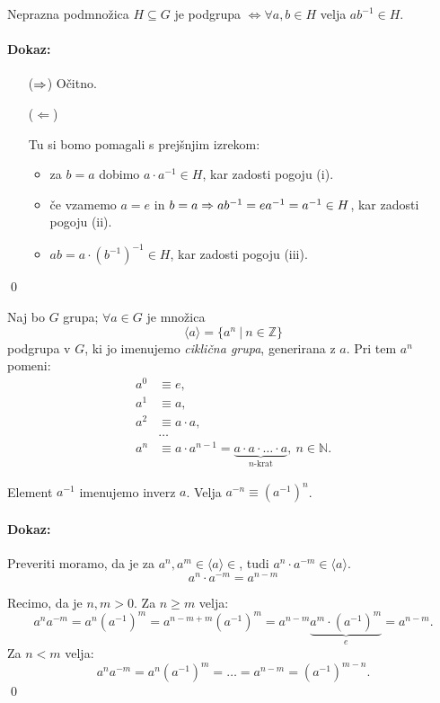 \begin{trditev}
	Neprazna podmno\v zica $H \subseteq G$ je podgrupa $\iff \forall a,b \in H$ velja $ab^{-1} \in H$.
\end{trditev}

\paragraph{Dokaz:}
\begin{itemize}
	\item[($\Rightarrow$)]{ O\v citno.}
	\item[($\Leftarrow$)]{Tu si bomo pomagali s prej\v snjim izrekom:
		\begin{itemize}
			\item{za $b = a$ dobimo $a\cdot a^{-1} \in H$, kar zadosti pogoju (i).}
			\item{\v ce vzamemo $a = e$ in $b = a \Rightarrow ab^{-1} = ea^{-1} = a^{-1} \in H$, kar zadosti pogoju (ii).}
			\item{$ab = a \cdot (b^{-1})^{-1} \in H$, kar zadosti pogoju (iii).}
		\end{itemize}}
\end{itemize}
\qed

\begin{posledica} Naj bo $G$ grupa; $\forall a \in G$ je mno\v zica
\[
	\langle a \rangle = \{a^n\ |\ n\in\mathbb{Z}\}
\]
podgrupa v $G$, ki jo imenujemo \emph{cikli\v cna grupa}, generirana z $a$. Pri tem $a^n$ pomeni:
\begin{align*}
	a^0 &\equiv e, \\
	a^1 &\equiv a, \\
	a^2 &\equiv a\cdot a, \\
	&\ldots \\
	a^n &\equiv a\cdot a^{n-1} = \underbrace{a\cdot a\cdot \ldots \cdot a}_{n\text{-krat}},\ n\in \mathbb{N}.
\end{align*}

\ni Element $a^{-1}$ imenujemo inverz $a$. Velja $a^{-n} \equiv (a^{-1})^n$.
\end{posledica}

\paragraph{Dokaz:}
Preveriti moramo, da je za $a^n,a^m \in \langle a \rangle \in$, tudi $a^n\cdot a^{-m} \in \langle a\rangle$.
\[
	a^n\cdot a^{-m} = a^{n-m}
\]

\ni Recimo, da je $n,m > 0$. Za $n \geq m$ velja:
\[
	a^n a^{-m} = a^n (a^{-1})^m = a^{n-m+m} (a^{-1})^m = a^{n-m} \underbrace{a^m\cdot(a^{-1})^m}_{e} = a^{n-m}.
\]
Za $n < m$ velja:
\[
	a^n a^{-m} = a^n(a^{-1})^m = \ldots = a^{n-m} = (a^{-1})^{m-n}.
\]
\qed

